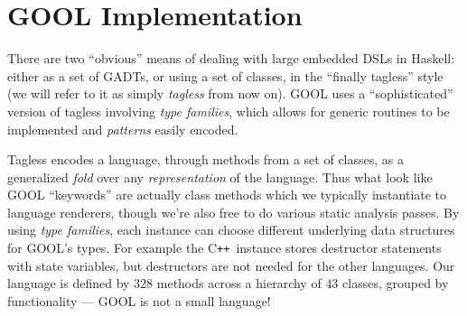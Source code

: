 \documentclass[sigplan,review,prologue,dvipsnames]{acmart}
\newcommand{\Cplusplus}{C\texttt{++}}
\begin{document}
\section{GOOL Implementation} \label{sec:implementation}

There are two ``obvious'' means of dealing with large embedded DSLs in Haskell:
either as a set of GADTs, or using a set of
classes, in the ``finally tagless'' style~\cite{carette2009finally} (we will
refer to it as simply \emph{tagless} from now on).  GOOL
uses a ``sophisticated'' version of tagless involving \emph{type families}, 
which allows for generic routines to be implemented and \emph{patterns} easily 
encoded.

Tagless encodes a language, 
through methods from a set of classes, as a generalized
\emph{fold} over any \emph{representation} of the language.  Thus what
look like GOOL ``keywords'' are actually class methods which we typically 
instantiate to language renderers, though we're also free to do various static 
analysis passes. By using \emph{type families}, each instance can choose
different underlying data structures for GOOL's types.  For example the
\Cplusplus~instance stores destructor statements with state variables, but 
destructors are not needed for the other languages. Our language is defined by 
$328$ methods across a hierarchy of $43$ classes, grouped by functionality 
--- GOOL is not a small language!
\end{document}
